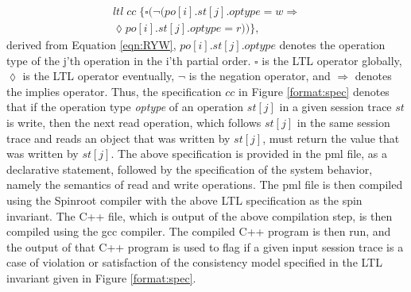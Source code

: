 \documentclass[journal,compsoc]{IEEEtran}
\begin{document}
  \begin{align*}%
 ltl \; \mathit{cc}  \; \{  \square ( \lnot (\mathit{po}[i].\mathit{st}[j].\mathit{optype} = w \Rightarrow \\
 \lozenge  \mathit{po}[i].\mathit{st}[j].\mathit{optype} = r)) \},
    \end{align*}
     derived from Equation \ref{eqn:RYW}, $\mathit{po}[i].\mathit{st}[j].\mathit{optype}$ denotes the operation type of the j'th operation in the i'th partial order. $\square$ is the LTL operator globally, $\lozenge$ is the LTL operator eventually, $\lnot$ is the negation operator, and   $\Rightarrow$ denotes the implies operator.  Thus, the specification $cc$ in  Figure \ref{format:spec} denotes that if the operation type \emph{optype} of an operation $st[j]$ in a given session trace $st$ is write, then the next read operation, which follows $st[j]$ in the same session trace and reads an  object that was written by $st[j]$, must return the value that was written by $st[j]$.
   The above specification is provided in the pml file, as a declarative statement, followed by the specification of the system behavior, namely the semantics of read and write operations. The pml file is then compiled using the Spinroot compiler with the above LTL specification as the spin invariant.  The  C++ file, which is output of the above compilation step, is then compiled using the gcc compiler. The compiled C++ program is then  run, and the output of that C++ program is used to flag if a given input session trace is a case of violation or satisfaction of the consistency model specified in the LTL invariant given in Figure \ref{format:spec}.

\end{document}
